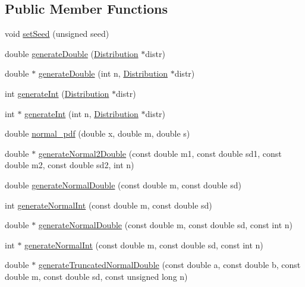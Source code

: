 \subsection*{Public Member Functions}
\begin{DoxyCompactItemize}
\item 
void \hyperlink{class_random_number_generator_a20e812772b0544720b32256911e372e2}{set\+Seed} (unsigned seed)
\item 
double \hyperlink{class_random_number_generator_a8d08427ba246ec354a7acacde8690df8}{generate\+Double} (\hyperlink{class_distribution}{Distribution} $\ast$distr)
\item 
double $\ast$ \hyperlink{class_random_number_generator_abccfd1a04f5a1f802f4b3479b5fbc1e8}{generate\+Double} (int n, \hyperlink{class_distribution}{Distribution} $\ast$distr)
\item 
int \hyperlink{class_random_number_generator_af172029ab4a467cf9c88d5fcdf23a248}{generate\+Int} (\hyperlink{class_distribution}{Distribution} $\ast$distr)
\item 
int $\ast$ \hyperlink{class_random_number_generator_af390d4dc616cd8ebd856e8e1214a5943}{generate\+Int} (int n, \hyperlink{class_distribution}{Distribution} $\ast$distr)
\item 
double \hyperlink{class_random_number_generator_a4e661a49e8dd66e13c313c99adefddb0}{normal\+\_\+pdf} (double x, double m, double s)
\item 
double $\ast$ \hyperlink{class_random_number_generator_a6a8cdbfdb3343a10aab18b83fc6ce0dc}{generate\+Normal2\+Double} (const double m1, const double sd1, const double m2, const double sd2, int n)
\item 
double \hyperlink{class_random_number_generator_a2598d9959bf595c3703c1d8e24f6e2f1}{generate\+Normal\+Double} (const double m, const double sd)
\item 
int \hyperlink{class_random_number_generator_ab021970135b4a6227fc59b55e5b80bd6}{generate\+Normal\+Int} (const double m, const double sd)
\item 
double $\ast$ \hyperlink{class_random_number_generator_a8a08591104b4fd1943eade351aa126c9}{generate\+Normal\+Double} (const double m, const double sd, const int n)
\item 
int $\ast$ \hyperlink{class_random_number_generator_a64114a9bde5a61ef8eb7d99d36d7787a}{generate\+Normal\+Int} (const double m, const double sd, const int n)
\item 
double $\ast$ \hyperlink{class_random_number_generator_a4e0cc6be3677ba52821cd4e0ae92cca9}{generate\+Truncated\+Normal\+Double} (const double a, const double b, const double m, const double sd, const unsigned long n)

\end{DoxyCompactItemize}
